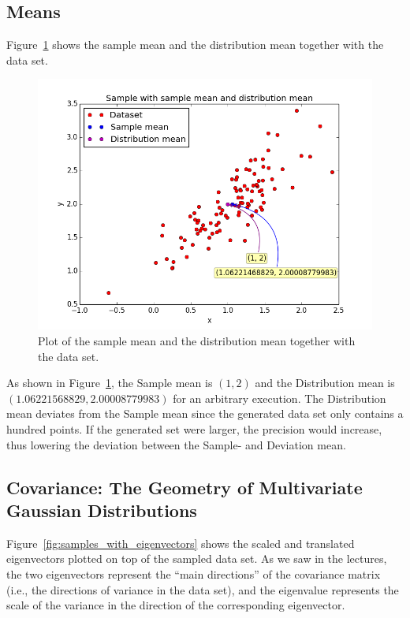 \documentclass[a4paper]{article}
\begin{document}
\subsection{Means}
Figure~\ref{fig:samples_with_mean} shows the sample mean and the distribution mean together with the data set.

\begin{figure}[H]
  \centering
  \includegraphics[width=.6\linewidth]{figures/samples_with_mean.png}
  \caption{Plot of the sample mean and the distribution mean together with the data set.}
  \label{fig:samples_with_mean}
\end{figure}

As shown in Figure~\ref{fig:samples_with_mean}, the Sample mean is $(1, 2)$ and the Distribution mean is $(1.06221568829, 2.00008779983)$ for an arbitrary execution. The Distribution mean deviates from the Sample mean since the generated data set only contains a hundred points. If the generated set were larger, the precision would increase, thus lowering the deviation between the Sample- and Deviation mean.

\subsection{Covariance: The Geometry of Multivariate Gaussian Distributions}
Figure~\ref{fig:samples_with_eigenvectors} shows the scaled and translated eigenvectors plotted on top of the sampled data set. As we saw in the lectures, the two eigenvectors represent the ``main directions'' of the covariance matrix (i.e., the directions of variance in the data set), and the eigenvalue represents the scale of the variance in the direction of the corresponding eigenvector.
\end{document}
